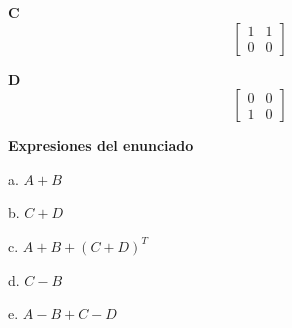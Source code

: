 \documentclass[11pt,a4paper,landscape]{article}
\begin{document}
\par\smallskip \begin{minipage}[t]{.47\linewidth}\centering \textbf{C}\[\begin{bmatrix}1 & 1\\0 & 0\end{bmatrix}\]\end{minipage}\hfill\begin{minipage}[t]{.47\linewidth}\centering \textbf{D}\[\begin{bmatrix}0 & 0\\1 & 0\end{bmatrix}\]\end{minipage}\par\smallskip
\textbf{Expresiones del enunciado}\par
a. \(A+B\)\par
b. \(C+D\)\par
c. \(A+B+(C+D)^T\)\par
d. \(C-B\)\par
e. \(A-B+C-D\)\par
\end{document}
